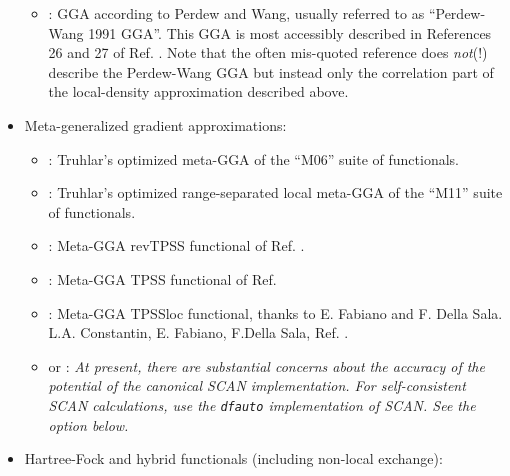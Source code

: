 \begin{itemize}
\begin{itemize}
      \item {} : GGA according to Perdew and Wang,
        usually referred to as  
        ``Perdew-Wang 1991 GGA''. This GGA is most accessibly
        described in References 26 and 27 of Ref. \cite{Perdew92}. Note
        that the often mis-quoted reference \cite{Per92} does
        \emph{not}(!) describe the Perdew-Wang GGA but instead only the
        correlation part of the local-density approximation described above.
    \end{itemize}
  \item Meta-generalized gradient approximations:
    \begin{itemize}
      \item {} : Truhlar's optimized meta-GGA of the ``M06'' suite of
        functionals. \cite{ZhaoTruhlar06_M06-L}
      \item {} : Truhlar's optimized range-separated local meta-GGA of the ``M11'' suite of
         functionals. \cite{PeveratiTruhlar11_M11-L}
      \item {} : Meta-GGA revTPSS functional of Ref. \cite{Perdew09_revTPSS, Perdew11_revTPSS}.
      \item {} : Meta-GGA TPSS functional of Ref. \cite{Tao03_TPSS}
      \item {} : Meta-GGA TPSSloc functional, thanks to E. Fabiano
         and F. Della Sala. L.A. Constantin, E. Fabiano, F.Della Sala,
         Ref. \cite{Constantin2012}.
      \item {} or : \emph{At present, there are
      substantial concerns about the accuracy of the potential of the canonical
      SCAN implementation. For self-consistent SCAN calculations, use the \texttt{dfauto} implementation of SCAN. See the  option below.}
    \end{itemize}
  \item Hartree-Fock and hybrid functionals (including non-local exchange): 

\end{itemize}

